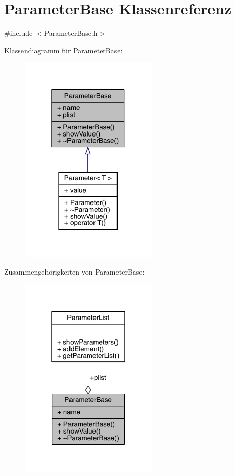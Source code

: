 \hypertarget{class_parameter_base}{}\section{Parameter\+Base Klassenreferenz}
\label{class_parameter_base}


{\ttfamily \#include $<$Parameter\+Base.\+h$>$}



Klassendiagramm für Parameter\+Base\+:
\nopagebreak
\begin{figure}[H]
\begin{center}
\leavevmode
\includegraphics[width=187pt]{class_parameter_base__inherit__graph}
\end{center}
\end{figure}


Zusammengehörigkeiten von Parameter\+Base\+:
\nopagebreak
\begin{figure}[H]
\begin{center}
\leavevmode
\includegraphics[width=187pt]{class_parameter_base__coll__graph}
\end{center}
\end{figure}
